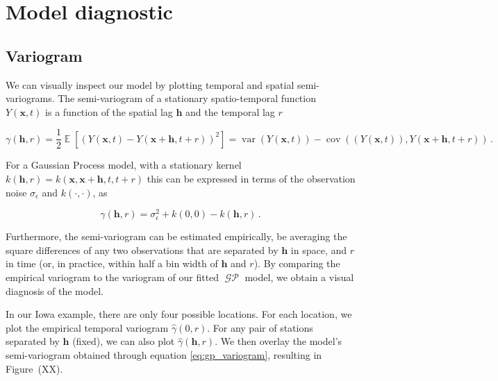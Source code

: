 \documentclass[letter]{article}
\newcommand{\genericdel}[3]{%
      \left#1#3\right#2
    }
\newcommand{\del}[1]{\genericdel(){#1}}
\newcommand{\sbr}[1]{\genericdel[]{#1}}
\DeclareMathOperator{\E}{\mathbb{E}}
\DeclareMathOperator{\cov}{{cov}}
\DeclareMathOperator{\var}{{var}}
\DeclareMathOperator{\GP}{\mathcal{GP}}
\newcommand{\xvec}{\mathbold{x}}
\newcommand{\hvec}{\mathbold{h}}
\newcommand{\sigman}{\sigma_{\epsilon}}
\begin{document}
    	\section{Model diagnostic}\label{model-diagnostic}

\subsection{Variogram}\label{variogram}

We can visually inspect our model by plotting temporal and spatial
semi-variograms. The semi-variogram of a stationary spatio-temporal
function \(Y(\xvec,t)\) is a function of the spatial lag \(\hvec\) and
the temporal lag \(r\)

\begin{equation}
    \gamma\del{\hvec,r} = \frac{1}{2} \E\sbr{\del{Y\del{\xvec,t}-Y\del{\xvec+\hvec,t+r}}^2} = \var\del{ Y\del{\xvec,t}} - \cov\del{ \del{Y\del{\xvec,t}} , Y\del{\xvec+\hvec,t+r}}\,.
\end{equation}

For a Gaussian Process model, with a stationary kernel
\(k(\hvec,r)=k(\xvec,\xvec+\hvec,t,t+r)\) this can be expressed in terms
of the observation noise \(\sigman\) and \(k(\cdot,\cdot)\), as

\begin{equation}
    \label{eq:gp_variogram}
    \gamma\del{\hvec,r} = \sigman^2 + k\del{0,0} - k(\hvec,r)\,.
\end{equation}

Furthermore, the semi-variogram can be estimated empirically, be
averaging the square differences of any two observations that are
separated by \(\hvec\) in space, and \(r\) in time (or, in practice,
within half a bin width of \(\hvec\) and \(r\)). By comparing the
empirical variogram to the variogram of our fitted \(\GP\) model, we
obtain a visual diagnosis of the model.

In our Iowa example, there are only four possible locations. For each
location, we plot the empirical temporal variogram
\(\hat\gamma\del{0,r}\). For any pair of stations separated by \(\hvec\)
(fixed), we can also plot \(\hat\gamma\del{\hvec,r}\). We then overlay
the model's semi-variogram obtained through equation
\eqref{eq:gp_variogram}, resulting in Figure~(XX).
\end{document}
